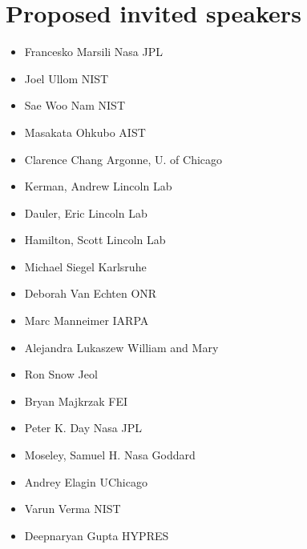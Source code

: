 \documentclass{article}
\begin{document}
\section{Proposed invited speakers}
\begin{itemize}
\item Francesko Marsili	Nasa JPL
\item Joel Ullom	NIST
\item Sae Woo Nam	NIST
\item Masakata Ohkubo	AIST
\item Clarence Chang 	Argonne, U. of Chicago
\item Kerman, Andrew 	Lincoln Lab
\item Dauler, Eric	Lincoln Lab
\item Hamilton, Scott	Lincoln Lab
\item Michael Siegel	Karlsruhe
\item Deborah Van Echten	ONR
\item Marc Manneimer	IARPA
\item Alejandra Lukaszew	William and Mary
\item Ron Snow	Jeol
\item Bryan Majkrzak	FEI
\item Peter K. Day	Nasa JPL
\item Moseley, Samuel H.	Nasa Goddard
\item Andrey Elagin	UChicago
\item Varun Verma	NIST
\item Deepnaryan Gupta HYPRES
\end{itemize}
\end{document}
